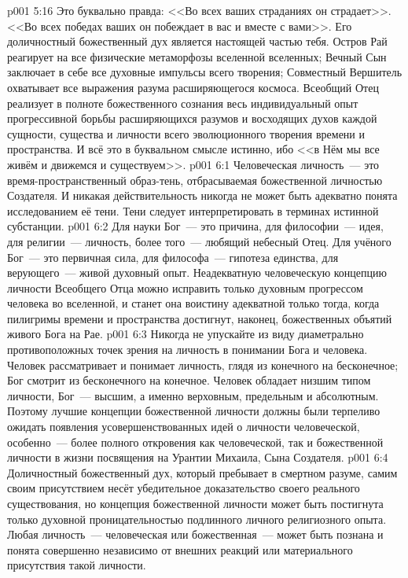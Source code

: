 \vs p001 5:16 Это буквально правда: <<Во всех ваших страданиях он страдает>>. <<Во всех победах ваших он побеждает в вас и вместе с вами>>. Его доличностный божественный дух является настоящей частью тебя. Остров Рай реагирует на все физические метаморфозы вселенной вселенных; Вечный Сын заключает в себе все духовные импульсы всего творения; Совместный Вершитель охватывает все выражения разума расширяющегося космоса. Всеобщий Отец реализует в полноте божественного сознания весь индивидуальный опыт прогрессивной борьбы расширяющихся разумов и восходящих духов каждой сущности, существа и личности всего эволюционного творения времени и пространства. И всё это в буквальном смысле истинно, ибо <<в Нём мы все живём и движемся и существуем>>.
\vs p001 6:1 Человеческая личность~--- это время\hyp{}пространственный образ\hyp{}тень, отбрасываемая божественной личностью Создателя. И никакая действительность никогда не может быть адекватно понята исследованием её тени. Тени следует интерпретировать в терминах истинной субстанции.
\vs p001 6:2 \pc Для науки Бог~--- это причина, для философии~--- идея, для религии~--- личность, более того~--- любящий небесный Отец. Для учёного Бог~--- это первичная сила, для философа~--- гипотеза единства, для верующего~--- живой духовный опыт. Неадекватную человеческую концепцию личности Всеобщего Отца можно исправить только духовным прогрессом человека во вселенной, и станет она воистину адекватной только тогда, когда пилигримы времени и пространства достигнут, наконец, божественных объятий живого Бога на Рае.
\vs p001 6:3 Никогда не упускайте из виду диаметрально противоположных точек зрения на личность в понимании Бога и человека. Человек рассматривает и понимает личность, глядя из конечного на бесконечное; Бог смотрит из бесконечного на конечное. Человек обладает низшим типом личности, Бог~--- высшим, а именно верховным, предельным и абсолютным. Поэтому лучшие концепции божественной личности должны были терпеливо ожидать появления усовершенствованных идей о личности человеческой, особенно~--- более полного откровения как человеческой, так и божественной личности в жизни посвящения на Урантии Михаила, Сына Создателя.
\vs p001 6:4 \pc Доличностный божественный дух, который пребывает в смертном разуме, самим своим присутствием несёт убедительное доказательство своего реального существования, но концепция божественной личности может быть постигнута только духовной проницательностью подлинного личного религиозного опыта. Любая личность~--- человеческая или божественная~--- может быть познана и понята совершенно независимо от внешних реакций или материального присутствия такой личности.
